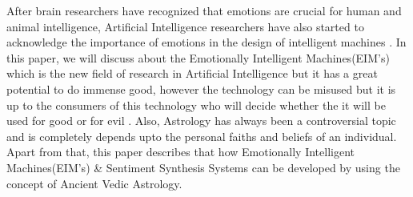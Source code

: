 After brain researchers have recognized that emotions are crucial for human and animal intelligence, Artificial Intelligence researchers have also started to acknowledge the importance of emotions in the design of intelligent machines \cite{atmos13081292}. In this paper, we will discuss about the Emotionally Intelligent Machines(EIM's) which is the new field of research in Artificial Intelligence but it has a great potential to do immense good, however the technology can be misused but it is up to the consumers of this technology who will decide whether the it will be used for good or for evil \cite{doi:10.1080/14755610.2022.2093234}. Also, Astrology has always been a controversial topic and is completely depends upto the personal faiths and beliefs of an individual. Apart from that, this paper describes that how Emotionally\cite{unknown} Intelligent Machines(EIM's) \& Sentiment Synthesis Systems can be developed by using the concept of Ancient Vedic Astrology.\cite{article}